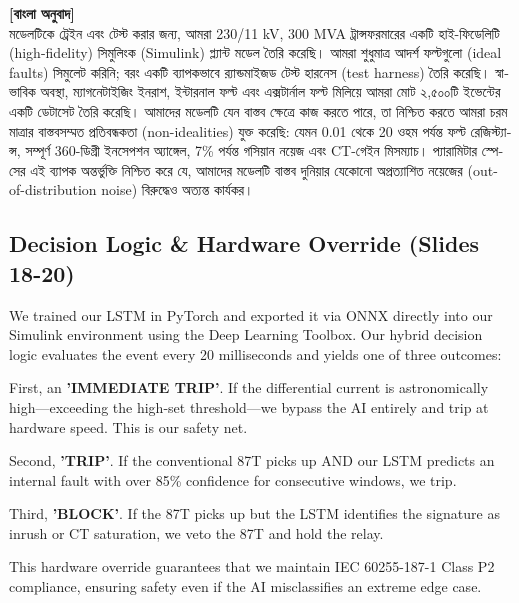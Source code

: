 \documentclass[12pt]{article}
\begin{document}
\begin{bengali}
\textbf{[বাংলা অনুবাদ]} \\
মডেলটিকে ট্রেইন এবং টেস্ট করার জন্য, আমরা 230/11 kV, 300 MVA ট্রান্সফরমারের একটি হাই-ফিডেলিটি (high-fidelity) সিমুলিংক (Simulink) প্ল্যান্ট মডেল তৈরি করেছি। আমরা শুধুমাত্র আদর্শ ফল্টগুলো (ideal faults) সিমুলেট করিনি; বরং একটি ব্যাপকভাবে র‍্যান্ডমাইজড টেস্ট হারনেস (test harness) তৈরি করেছি। স্বাভাবিক অবস্থা, ম্যাগনেটাইজিং ইনরাশ, ইন্টারনাল ফল্ট এবং এক্সটার্নাল ফল্ট মিলিয়ে আমরা মোট ২,৫০০টি ইভেন্টের একটি ডেটাসেট তৈরি করেছি। আমাদের মডেলটি যেন বাস্তব ক্ষেত্রে কাজ করতে পারে, তা নিশ্চিত করতে আমরা চরম মাত্রার বাস্তবসম্মত প্রতিবন্ধকতা (non-idealities) যুক্ত করেছি: যেমন 0.01 থেকে 20 ওহম পর্যন্ত ফল্ট রেজিস্ট্যান্স, সম্পূর্ণ 360-ডিগ্রী ইনসেপশন অ্যাঙ্গেল, 7\% পর্যন্ত গসিয়ান নয়েজ এবং CT-গেইন মিসম্যাচ। প্যারামিটার স্পেসের এই ব্যাপক অন্তর্ভুক্তি নিশ্চিত করে যে, আমাদের মডেলটি বাস্তব দুনিয়ার যেকোনো অপ্রত্যাশিত নয়েজের (out-of-distribution noise) বিরুদ্ধেও অত্যন্ত কার্যকর।
\end{bengali}

\subsection*{Decision Logic \& Hardware Override (Slides 18-20)}
We trained our LSTM in PyTorch and exported it via ONNX directly into our Simulink environment using the Deep Learning Toolbox. Our hybrid decision logic evaluates the event every 20 milliseconds and yields one of three outcomes: 

First, an \textbf{'IMMEDIATE TRIP'}. If the differential current is astronomically high—exceeding the high-set threshold—we bypass the AI entirely and trip at hardware speed. This is our safety net.

Second, \textbf{'TRIP'}. If the conventional 87T picks up AND our LSTM predicts an internal fault with over 85\% confidence for consecutive windows, we trip.

Third, \textbf{'BLOCK'}. If the 87T picks up but the LSTM identifies the signature as inrush or CT saturation, we veto the 87T and hold the relay.

This hardware override guarantees that we maintain IEC 60255-187-1 Class P2 compliance, ensuring safety even if the AI misclassifies an extreme edge case.
\end{document}
